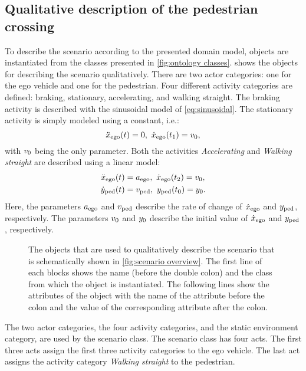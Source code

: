 \subsection{Qualitative description of the pedestrian crossing}
\label{sec:example qualitative}
To describe the scenario according to the presented domain model, objects are instantiated from the classes presented in \cref{fig:ontology classes}.  shows the objects for describing the scenario qualitatively. There are two actor categories: one for the ego vehicle and one for the pedestrian. Four different activity categories are defined: braking, stationary, accelerating, and walking straight. The braking activity is described with the sinusoidal model of \cref{eq:sinusoidal}. The stationary activity is simply modeled using a constant, i.e.:
\cbstartc
\begin{equation}
	\ddot{x}_{\mathrm{ego}}(t) = 0,\ \dot{x}_{\mathrm{ego}}(t_{1}) = v_{0},
\end{equation}
with $v_{0}$ being the only parameter.
Both the activities \emph{Accelerating} and \emph{Walking straight} are described using a linear model:
\begin{align}
	\ddot{x}_{\mathrm{ego}}(t) &= a_{\mathrm{ego}},\ \dot{x}_{\mathrm{ego}}(t_{2}) = v_{0}, \\
	\dot{y}_{\mathrm{ped}}(t) &= v_{\mathrm{ped}},\ y_{\mathrm{ped}}(t_{0}) = y_{0}.
\end{align}
Here, the parameters $a_{\mathrm{ego}}$ and $v_{\mathrm{ped}}$ describe the rate of change of $\dot{x}_{\mathrm{ego}}$ and $y_{\mathrm{ped}}$, respectively. The parameters $v_{0}$ and $y_{0}$ describe the initial value of $\dot{x}_{\mathrm{ego}}$ and $y_{\mathrm{ped}}$, respectively.
\cbend

\begin{figure}
	\centering
	
	\caption{The objects that are used to qualitatively describe the scenario that is schematically shown in \cref{fig:scenario overview}. The first line of each blocks shows the name (before the double colon) and the class from which the object is instantiated. The following lines show the attributes of the object with the name of the attribute before the colon and the value of the corresponding attribute after the colon.}
	\label{fig:example qualitative}
\end{figure}

\cbstart
The two actor categories, the four activity categories, and the static environment category, are used by the scenario class. The scenario class has four acts. The first three acts assign the first three activity categories to the ego vehicle. The last act assigns the activity category \emph{Walking straight} to the pedestrian.

